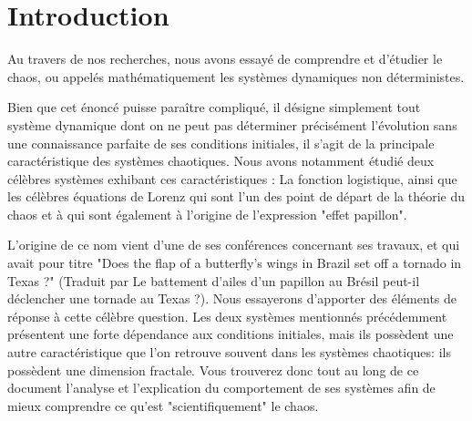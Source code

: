 \chapter{Introduction}
Au travers de nos recherches, nous avons essayé de comprendre et d'étudier le chaos, ou appelés mathématiquement les systèmes dynamiques non déterministes. 

Bien que cet énoncé puisse paraître compliqué, il désigne simplement tout système dynamique dont on ne peut pas déterminer précisément l'évolution sans une connaissance parfaite de ses conditions initiales, il s'agit de la principale caractéristique des systèmes chaotiques. Nous avons notamment étudié deux célèbres systèmes exhibant ces caractéristiques : La fonction logistique, ainsi que les célèbres équations de Lorenz qui sont l'un des \og point de départ \fg{} de la théorie du chaos et à qui sont également à l'origine de l'expression "effet papillon".

L'origine de ce nom vient d'une de ses conférences concernant ses travaux, et qui avait pour titre "Does the flap of a butterfly’s wings in Brazil set off a tornado in Texas ?" (Traduit par \og Le battement d'ailes d'un papillon au Brésil peut-il déclencher une tornade au Texas ?\fg{}). Nous essayerons d’apporter des éléments de réponse à cette célèbre question. Les deux systèmes mentionnés précédemment présentent une forte dépendance aux conditions initiales, mais ils possèdent une autre caractéristique que l'on retrouve souvent dans les systèmes chaotiques: ils possèdent une dimension fractale. Vous trouverez donc tout au long de ce document l'analyse et l'explication du comportement de ses systèmes afin de mieux comprendre ce qu'est "scientifiquement" le chaos.
  
